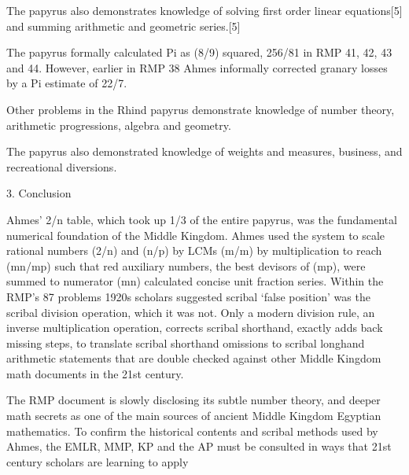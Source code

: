 \documentclass[12pt]{article}
\begin{document}
The papyrus also demonstrates knowledge of solving first order linear equations[5] and summing arithmetic and geometric series.[5]

The papyrus formally calculated Pi as (8/9) squared, 256/81 in RMP 41, 42, 43 and 44. However, earlier in RMP 38 Ahmes informally corrected granary losses by a Pi estimate of  22/7.

Other problems in the Rhind papyrus demonstrate knowledge of number theory, arithmetic progressions, algebra and geometry.

The papyrus also demonstrated knowledge of weights and measures, business, and recreational diversions.

3. Conclusion

Ahmes’ 2/n table, which took up 1/3 of the entire papyrus, was the fundamental numerical foundation of the Middle Kingdom. Ahmes used the system to scale rational numbers (2/n) and (n/p) by LCMs (m/m) by multiplication to reach (mn/mp) such that red auxiliary numbers, the best devisors of (mp), were summed to numerator (mn) calculated concise unit fraction series. Within the RMP’s 87 problems 1920s scholars suggested scribal ‘false position’ was the scribal division operation, which it was not. Only a modern division rule, an inverse multiplication operation, corrects scribal shorthand, exactly adds back missing steps, to translate scribal shorthand omissions to scribal longhand arithmetic statements that are double checked against other Middle Kingdom math documents in the 21st century.

The RMP document is slowly disclosing its subtle number theory, and deeper math secrets as one of the main sources of ancient Middle Kingdom Egyptian mathematics. To confirm the historical contents and scribal methods used by Ahmes, the EMLR, MMP, KP and the AP must be consulted in ways that 21st century scholars are learning to apply
\end{document}
